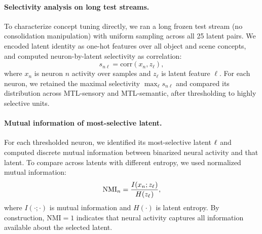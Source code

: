 \documentclass{article}
\begin{document}
\paragraph{Selectivity analysis on long test streams.}
To characterize concept tuning directly, we ran a long frozen test stream (no consolidation manipulation) with uniform sampling across all 25 latent pairs. We encoded latent identity as one-hot features over all object and scene concepts, and computed neuron-by-latent selectivity as correlation:
\begin{equation}
s_{n\ell}=\mathrm{corr}(x_n, z_\ell),
\end{equation}
where $x_n$ is neuron $n$ activity over samples and $z_\ell$ is latent feature $\ell$. For each neuron, we retained the maximal selectivity $\max_\ell s_{n\ell}$ and compared its distribution across MTL-sensory and MTL-semantic, after thresholding to highly selective units.

\paragraph{Mutual information of most-selective latent.}
For each thresholded neuron, we identified its most-selective latent $\ell^{\*}$ and computed discrete mutual information between binarized neural activity and that latent. To compare across latents with different entropy, we used normalized mutual information:
\begin{equation}
\mathrm{NMI}_n=\frac{I(x_n; z_{\ell^{\*}})}{H(z_{\ell^{\*}})},
\end{equation}
where $I(\cdot;\cdot)$ is mutual information and $H(\cdot)$ is latent entropy. By construction, $\mathrm{NMI}=1$ indicates that neural activity captures all information available about the selected latent.
\end{document}
